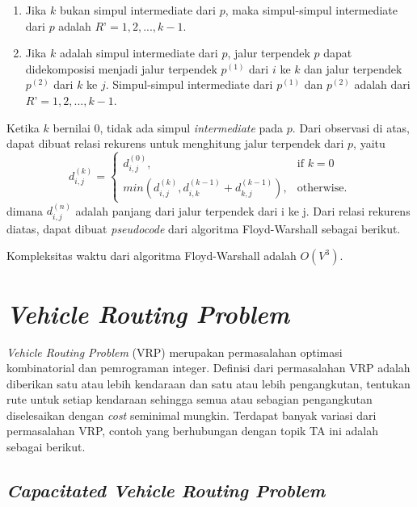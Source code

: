   \begin{enumerate}
    \item Jika $k$ bukan simpul intermediate dari $p$, maka simpul-simpul intermediate dari $p$ adalah $R’ = {1, 2, ..., k-1}$.
    \item Jika $k$ adalah simpul intermediate dari $p$, jalur terpendek $p$ dapat didekomposisi menjadi jalur terpendek $p^{(1)}$ dari $i$ ke $k$ 
    dan jalur terpendek $p^{(2)}$ dari $k$ ke $j$. Simpul-simpul intermediate dari $p^{(1)}$ dan $p^{(2)}$ adalah dari $R’ = {1, 2, ..., k-1}$.
  \end{enumerate}

  Ketika $k$ bernilai 0, tidak ada simpul \textit{intermediate} pada $p$. Dari observasi di atas,
  dapat dibuat relasi rekurens untuk menghitung jalur terpendek dari $p$, yaitu
  \begin{equation}
    d_{i,j}^{(k)} =
    \begin{cases}
      d_{i,j}^{(0)}, & \text{if } k = 0\\
      min(d_{i,j}^{(k)}, d_{i,k}^{(k-1)} + d_{k,j}^{(k-1)}), & \text{otherwise}.
    \end{cases}
  \end{equation}
  dimana $d_{i,j}^{(n)}$ adalah panjang dari jalur terpendek dari i ke j. Dari relasi rekurens
  diatas, dapat dibuat \textit{pseudocode} dari algoritma Floyd-Warshall sebagai berikut.

  \medskip
  

  Kompleksitas waktu dari algoritma Floyd-Warshall adalah $O(V^{3})$.

\section{\textit{Vehicle Routing Problem}}

\textit{Vehicle Routing Problem} (VRP) merupakan permasalahan optimasi kombinatorial dan pemrograman
integer. Definisi dari permasalahan VRP adalah diberikan satu atau lebih kendaraan dan satu atau
lebih pengangkutan, tentukan rute untuk setiap kendaraan sehingga semua atau sebagian pengangkutan
diselesaikan dengan \textit{cost} seminimal mungkin. Terdapat banyak variasi dari permasalahan VRP,
contoh yang berhubungan dengan topik TA ini adalah sebagai berikut. 

\subsection{\textit{Capacitated Vehicle Routing Problem}}

